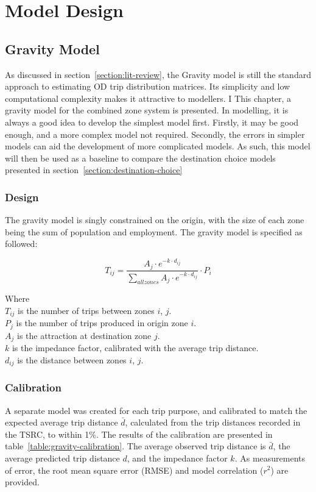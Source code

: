 \chapter{Model Design} 

\section{Gravity Model}
As discussed in section~\ref{section:lit-review}, the Gravity model is still the standard approach to estimating OD trip distribution matrices. Its simplicity and low computational complexity makes it attractive to modellers. I This chapter, a gravity model for the combined zone system is presented. In modelling, it is always a good idea to develop the simplest model first. Firstly, it may be good enough, and a more complex model not required. Secondly, the errors in simpler models can aid the development of more complicated models. As such, this model will then be used as a baseline to compare the destination choice models presented in section~\ref{section:destination-choice}

\subsection{Design}
The gravity model is singly constrained on the origin, with the size of each zone being the sum of population and employment. The gravity model is specified as followed:

$$ 
T_{ij} = \frac{A_j \cdot e^{-k \cdot d_{ij}}}{\sum_{all zones} A_j \cdot e^{-k \cdot d_{ij}}} \cdot P_i $$

Where \\
$T_{ij}$ is the number of trips between zones $i$, $j$. \\
$P_j$ is the number of trips produced in origin zone $i$.\\
$A_j$ is the attraction at destination zone $j$.\\
$k$ is the impedance factor, calibrated with the average trip distance.\\
$d_{ij}$ is the distance between zones $i$, $j$.\\


\subsection{Calibration}
A separate model was created for each trip purpose, and calibrated to match the expected average trip distance $\bar{d}$, calculated from the trip distances recorded in the TSRC, to within 1\%. The results of the calibration are presented in table~\ref{table:gravity-calibration}. The average observed trip distance is $\bar{d}$, the average predicted trip distance $d$, and the impedance factor $k$. As measurements of error, the root mean square error (RMSE) and model correlation ($r^2$) are provided.

